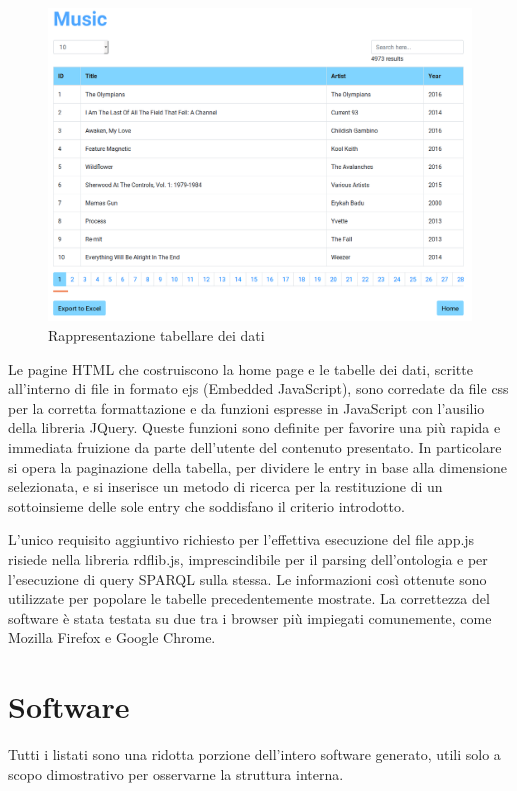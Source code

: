 \documentclass[Lau,binding=0.6cm,noexaminfo,oneside]{sapthesis}
\begin{document}
\begin{figure}[!htb]
  \centering
  \includegraphics[scale=0.34]{music.png}
  \caption{Rappresentazione tabellare dei dati}
\end{figure}

Le pagine HTML che costruiscono la home page e le tabelle dei dati, scritte all'interno di file in formato ejs (Embedded JavaScript), sono corredate da file css per la corretta formattazione e da funzioni espresse in JavaScript con l'ausilio della libreria JQuery. Queste funzioni sono definite per favorire una più rapida e immediata fruizione da parte dell'utente del contenuto presentato. In particolare si opera la paginazione della tabella, per dividere le entry in base alla dimensione selezionata, e si inserisce un metodo di ricerca per la restituzione di un sottoinsieme delle sole entry che soddisfano il criterio introdotto.\medskip

L'unico requisito aggiuntivo richiesto per l'effettiva esecuzione del file app.js risiede nella libreria rdflib.js, imprescindibile per il parsing dell'ontologia e per l'esecuzione di query SPARQL sulla stessa. Le informazioni così ottenute sono utilizzate per popolare le tabelle precedentemente mostrate. La correttezza del software è stata testata su due tra i browser più impiegati comunemente, come Mozilla Firefox e Google Chrome.

\appendix
\chapter{Software}
Tutti i listati sono una ridotta porzione dell'intero software generato, utili solo a scopo dimostrativo per osservarne la struttura interna.
\end{document}

